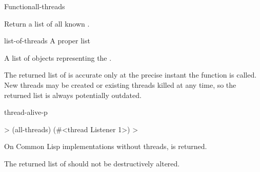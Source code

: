 \documentclass[10pt,twoside,english,pdftex]{article}
\begin{document}
\begin{functiondoc}{Function}{all-threads}{\noargs{} 
    }
%

\fnsyntax

\fnpurpose Return a list of all known .

\fnpackage {}

\fnmodule {}

\fnargs
\begin{args}{list-of-threads}
 A proper list
\end{args}

\fnreturns A list of objects representing the .

\fndescription The returned list of  is accurate only at the
precise instant the  function is called.  New
threads may be created or existing threads killed at any time, so the returned
list is always potentially outdated.

\begin{alsos}{thread-alive-p}
\also[threadp]
\end{alsos}

\fnexample
%
\W\supp
\begin{example}
  > (all-threads)
  (#<thread Listener 1>)
  >
\end{example}

\fnnotes On Common Lisp implementations without threads, \nil{} is returned.

The returned list of  should not be destructively
altered.

\end{functiondoc}

\end{document}

